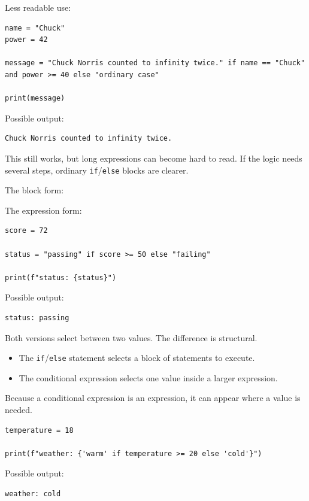 Less readable use:

\begin{verbatim}
name = "Chuck"
power = 42

message = "Chuck Norris counted to infinity twice." if name == "Chuck" and power >= 40 else "ordinary case"

print(message)
\end{verbatim}

Possible output:

\begin{verbatim}
Chuck Norris counted to infinity twice.
\end{verbatim}

This still works, but long expressions can become hard to read. If the logic needs several steps, ordinary \texttt{if}/\texttt{else} blocks are clearer.

The block form:

The expression form:

\begin{verbatim}
score = 72

status = "passing" if score >= 50 else "failing"

print(f"status: {status}")
\end{verbatim}

Possible output:

\begin{verbatim}
status: passing
\end{verbatim}

Both versions select between two values. The difference is structural.

\begin{itemize}
    \item The \texttt{if}/\texttt{else} statement selects a block of statements to execute.
    \item The conditional expression selects one value inside a larger expression.
\end{itemize}

Because a conditional expression is an expression, it can appear where a value is needed.

\begin{verbatim}
temperature = 18

print(f"weather: {'warm' if temperature >= 20 else 'cold'}")
\end{verbatim}

Possible output:

\begin{verbatim}
weather: cold
\end{verbatim}


